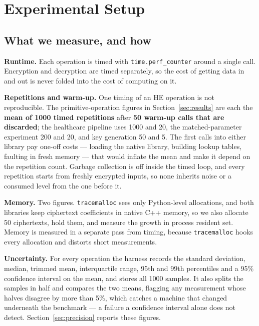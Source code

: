 \documentclass[11pt,a4paper]{article}
\begin{document}
\section{Experimental Setup}\label{sec:setup}

\subsection{What we measure, and how}

\textbf{Runtime.} Each operation is timed with \texttt{time.perf\_counter} around a
single call. Encryption and decryption are timed separately, so the cost of getting
data in and out is never folded into the cost of computing on it.

\textbf{Repetitions and warm-up.} One timing of an HE operation is not
reproducible. The primitive-operation figures in Section~\ref{sec:results} are each
the \textbf{mean of 1000 timed repetitions} after \textbf{50 warm-up calls that are
discarded}; the healthcare pipeline uses 1000 and 20, the matched-parameter
experiment 200 and 20, and key generation 50 and 5. The first calls into either
library pay one-off costs --- loading the native library, building lookup tables,
faulting in fresh memory --- that would inflate the mean and make it depend on the
repetition count. Garbage collection is off inside the timed loop, and every
repetition starts from freshly encrypted inputs, so none inherits noise or a consumed
level from the one before it.

\textbf{Memory.} Two figures. \texttt{tracemalloc} sees only Python-level
allocations, and both libraries keep ciphertext coefficients in native C++ memory, so
we also allocate 50 ciphertexts, hold them, and measure the growth in process
resident set. Memory is measured in a separate pass from timing, because
\texttt{tracemalloc} hooks every allocation and distorts short measurements.

\textbf{Uncertainty.} For every operation the harness records the standard
deviation, median, trimmed mean, interquartile range, 95th and 99th percentiles and
a 95\% confidence interval on the mean, and stores all 1000 samples. It also splits
the samples in half and compares the two means, flagging any measurement whose
halves disagree by more than 5\%, which catches a machine that changed underneath
the benchmark --- a failure a confidence interval alone does not detect.
Section~\ref{sec:precision} reports these figures.
\end{document}
